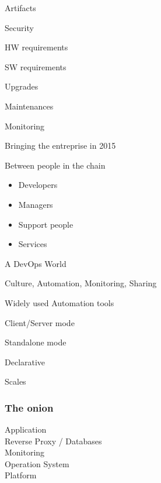 \begin{iframe}
\item Artifacts
\item Security
\item HW requirements
\item SW requirements
\item Upgrades
\item Maintenances
\item Monitoring
\end{iframe}
\begin{iframe}
\item Bringing the entreprise in 2015
\item Between people in the chain
    \begin{itemize}
        \item Developers
        \item Managers
        \item Support people
        \item Services
    \end{itemize}
\item A DevOps World
\item Culture, Automation, Monitoring, Sharing
\end{iframe}





\begin{iframe}[Puppet]
\item Widely used Automation tools
\item Client/Server mode
\item Standalone mode
\item Declarative
\item Scales
\end{iframe}

\begin{frame}
    \frametitle{The onion}
    \huge
    Application\\
    Reverse Proxy / Databases\\
    Monitoring\\
    Operation System\\
    Platform
\end{frame}

